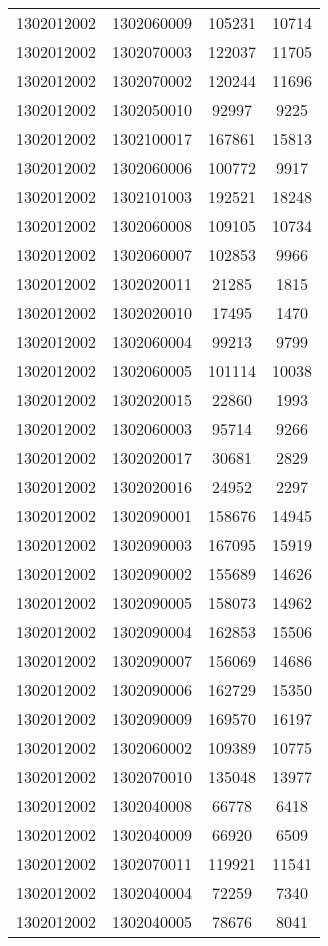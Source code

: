 \begin{longtable}{llcc}
1302012002 & 1302060009 & 105231 & 10714\\
1302012002 & 1302070003 & 122037 & 11705\\
1302012002 & 1302070002 & 120244 & 11696\\
1302012002 & 1302050010 & 92997 & 9225\\
1302012002 & 1302100017 & 167861 & 15813\\
1302012002 & 1302060006 & 100772 & 9917\\
1302012002 & 1302101003 & 192521 & 18248\\
1302012002 & 1302060008 & 109105 & 10734\\
1302012002 & 1302060007 & 102853 & 9966\\
1302012002 & 1302020011 & 21285 & 1815\\
1302012002 & 1302020010 & 17495 & 1470\\
1302012002 & 1302060004 & 99213 & 9799\\
1302012002 & 1302060005 & 101114 & 10038\\
1302012002 & 1302020015 & 22860 & 1993\\
1302012002 & 1302060003 & 95714 & 9266\\
1302012002 & 1302020017 & 30681 & 2829\\
1302012002 & 1302020016 & 24952 & 2297\\
1302012002 & 1302090001 & 158676 & 14945\\
1302012002 & 1302090003 & 167095 & 15919\\
1302012002 & 1302090002 & 155689 & 14626\\
1302012002 & 1302090005 & 158073 & 14962\\
1302012002 & 1302090004 & 162853 & 15506\\
1302012002 & 1302090007 & 156069 & 14686\\
1302012002 & 1302090006 & 162729 & 15350\\
1302012002 & 1302090009 & 169570 & 16197\\
1302012002 & 1302060002 & 109389 & 10775\\
1302012002 & 1302070010 & 135048 & 13977\\
1302012002 & 1302040008 & 66778 & 6418\\
1302012002 & 1302040009 & 66920 & 6509\\
1302012002 & 1302070011 & 119921 & 11541\\
1302012002 & 1302040004 & 72259 & 7340\\
1302012002 & 1302040005 & 78676 & 8041\\

\end{longtable}
